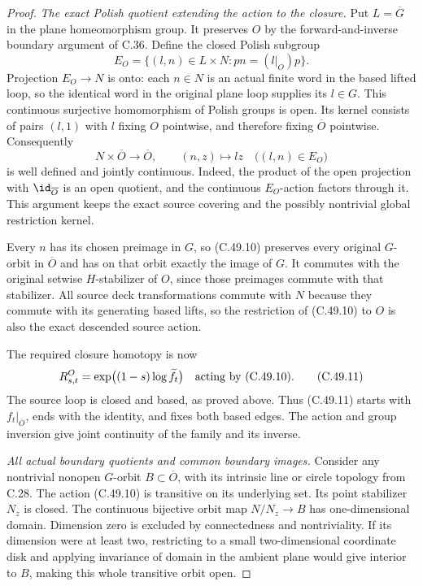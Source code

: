 \begin{proof}
\emph{The exact Polish quotient extending the action to the closure.}
Put $L=\overline G$ in the plane homeomorphism group.
It preserves $O$ by the forward-and-inverse boundary argument
of C.36. Define the closed Polish subgroup
\[
 E_O=\{(l,n)\in L\times N:
                  p n=(l|_O)p\}.                       \tag{C.49.9}
\]
Projection $E_O\to N$ is onto: each $n\in N$ is an actual
finite word in the based lifted loop, so the identical
word in the original plane loop supplies its $l\in G$.
This continuous surjective homomorphism of Polish groups
is open.
Its kernel consists of pairs $(l,1)$ with $l$ fixing $O$
pointwise, and therefore fixing $\overline O$ pointwise.
Consequently
\[
 N\times\overline O\longrightarrow\overline O,\qquad
     (n,z)\longmapsto lz\quad\bigl((l,n)\in E_O\bigr)     \tag{C.49.10}
\]
is well defined and jointly continuous.
Indeed, the product of the open projection with
$\id_{\overline O}$ is an open quotient, and the continuous
$E_O$-action factors through it.
This argument keeps the exact source covering and the
possibly nontrivial global restriction kernel.

Every $n$ has its chosen preimage in $G$, so (C.49.10)
preserves every original $G$-orbit in $\overline O$ and
has on that orbit exactly the image of $G$.
It commutes with the original setwise $H$-stabilizer of
$O$, since those preimages commute with that stabilizer.
All source deck transformations commute with $N$ because
they commute with its generating based lifts, so the
restriction of (C.49.10) to $O$ is also the exact descended
source action.

The required closure homotopy is now
\[
 R^O_{s,t}
   =\exp\bigl((1-s)\log\widetilde f_t\bigr)
           \quad\hbox{acting by (C.49.10)}.              \tag{C.49.11}
\]
The source loop is closed and based, as proved above.
Thus (C.49.11) starts with $f_t|_{\overline O}$, ends
with the identity, and fixes both based edges.
The action and group inversion give joint continuity
of the family and its inverse.

\emph{All actual boundary quotients and common boundary images.}
Consider any nontrivial nonopen $G$-orbit
$B\subset\overline O$, with its intrinsic line or circle
topology from C.28. The action (C.49.10) is transitive
on its underlying set. Its point stabilizer $N_z$ is closed.
The continuous bijective orbit map $N/N_z\to B$ has
one-dimensional domain.
Dimension zero is excluded by connectedness and nontriviality.
If its dimension were at least two, restricting to a small
two-dimensional coordinate disk and applying invariance
of domain in the ambient plane would give interior to
$B$, making this whole transitive orbit open.


\end{proof}
